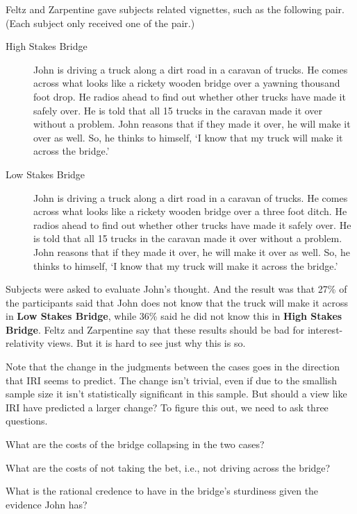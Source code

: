 \documentclass[oneside, a4paper]{book}
\begin{document}
Feltz and Zarpentine gave subjects related vignettes, such as the following pair. (Each subject only received one of the pair.)

\begin{description}
\item[High Stakes Bridge] John is driving a truck along a dirt road in a caravan of trucks. He comes across what looks like a rickety wooden bridge over a yawning thousand foot drop. He radios ahead to find out whether other trucks have made it safely over. He is told that all 15 trucks in the caravan made it over without a problem. John reasons that if they made it over, he will make it over as well. So, he thinks to himself, `I know that my truck will make it across the bridge.'

\item[Low Stakes Bridge] John is driving a truck along a dirt road in a caravan of trucks. He comes across what looks like a rickety wooden bridge over a three foot ditch. He radios ahead to find out whether other trucks have made it safely over. He is told that all 15 trucks in the caravan made it over without a problem. John reasons that if they made it over, he will make it over as well. So, he thinks to himself, `I know that my truck will make it across the bridge.' \citep[??]{FeltzZarpentine2010}
\end{description}

\noindent Subjects were asked to evaluate John's thought. And the result was that 27\% of the participants said that John does not know that the truck will make it across in \textbf{Low Stakes Bridge}, while 36\% said he did not know this in \textbf{High Stakes Bridge}. Feltz and Zarpentine say that these results should be bad for interest-relativity views. But it is hard to see just why this is so.

Note that the change in the judgments between the cases goes in the direction that IRI seems to predict. The change isn't trivial, even if due to the smallish sample size it isn't statistically significant in this sample. But should a view like IRI have predicted a larger change? To figure this out, we need to ask three questions.

\begin{enumerate*}
\item What are the costs of the bridge collapsing in the two cases?
\item What are the costs of not taking the bet, i.e., not driving across the bridge?
\item What is the rational credence to have in the bridge's sturdiness given the evidence John has?
\end{enumerate*}
\end{document}
